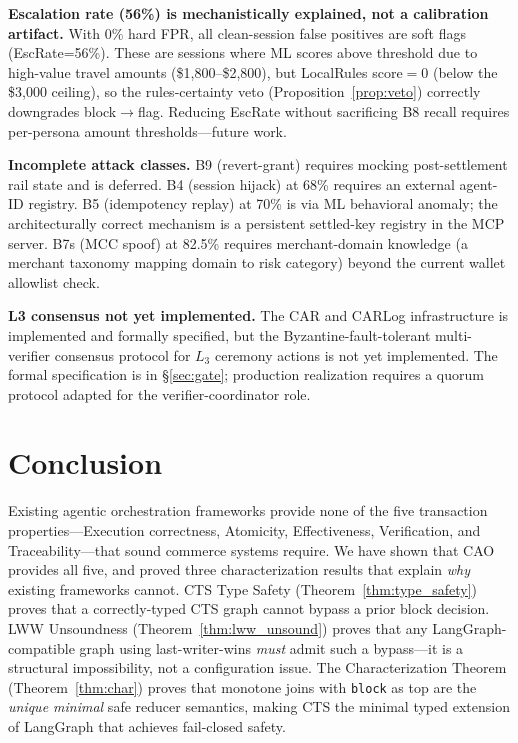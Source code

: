 \documentclass{article}
\begin{document}
\textbf{Escalation rate (56\%) is mechanistically explained, not a calibration artifact.} With 0\% hard FPR, all clean-session false positives are soft flags (EscRate=56\%). These are sessions where ML scores above threshold due to high-value travel amounts (\$1,800--\$2,800), but LocalRules score$=0$ (below the \$3,000 ceiling), so the rules-certainty veto (Proposition~\ref{prop:veto}) correctly downgrades block$\to$flag. Reducing EscRate without sacrificing B8 recall requires per-persona amount thresholds---future work.

\textbf{Incomplete attack classes.} B9 (revert-grant) requires mocking post-settlement rail state and is deferred. B4 (session hijack) at 68\% requires an external agent-ID registry. B5 (idempotency replay) at 70\% is via ML behavioral anomaly; the architecturally correct mechanism is a persistent settled-key registry in the MCP server. B7s (MCC spoof) at 82.5\% requires merchant-domain knowledge (a merchant taxonomy mapping domain to risk category) beyond the current wallet allowlist check.

\textbf{L3 consensus not yet implemented.} The CAR and CARLog infrastructure is implemented and formally specified, but the Byzantine-fault-tolerant multi-verifier consensus protocol for $L_3$ ceremony actions is not yet implemented. The formal specification is in \S\ref{sec:gate}; production realization requires a quorum protocol adapted for the verifier-coordinator role.

\section{Conclusion}

Existing agentic orchestration frameworks provide none of the five transaction properties---Execution correctness, Atomicity, Effectiveness, Verification, and Traceability---that sound commerce systems require. We have shown that CAO provides all five, and proved three characterization results that explain \emph{why} existing frameworks cannot. CTS Type Safety (Theorem~\ref{thm:type_safety}) proves that a correctly-typed CTS graph cannot bypass a prior block decision. LWW Unsoundness (Theorem~\ref{thm:lww_unsound}) proves that any LangGraph-compatible graph using last-writer-wins \emph{must} admit such a bypass---it is a structural impossibility, not a configuration issue. The Characterization Theorem (Theorem~\ref{thm:char}) proves that monotone joins with \texttt{block} as top are the \emph{unique minimal} safe reducer semantics, making CTS the minimal typed extension of LangGraph that achieves fail-closed safety.
\end{document}
